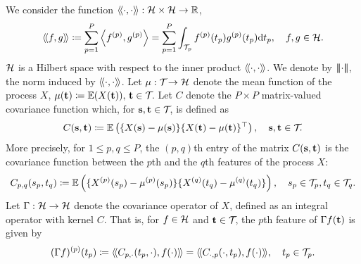 We consider the function $\langle\!\langle\cdot, \cdot\rangle\!\rangle : \mathcal{H} \times \mathcal{H} \rightarrow \mathbb{R}$,
\begin{equation}\label{eq:innerprodH}
    \langle\!\langle f, g\rangle\!\rangle \coloneqq \sum_{p=1}^{P} \left\langle f^{(p)}, g^{(p)}\right\rangle = \sum_{p=1}^{P}\int_{\mathcal{T}_{p}} f^{(p)}(t_p)g^{(p)}(t_p) {\rm d} t_p, \quad f, g \in \mathcal{H}.
\end{equation}
$\mathcal{H}$ is a Hilbert space with respect to the inner product $\langle\!\langle\cdot, \cdot\rangle\!\rangle$\citep{happMultivariateFunctionalPrincipal2018a}. We denote by $\left|\!\left|\!\left|\cdot\right|\!\right|\!\right|$, the norm induced by $\langle\!\langle\cdot, \cdot\rangle\!\rangle$. Let $\mu : \mathcal{T}_{} \rightarrow \mathcal{H}$ denote the mean function of the process $X$, $\mu(\mathbf{t}) \coloneqq \mathbb{E}(X(\mathbf{t})),\,\mathbf{t} \in \mathcal{T}_{}$. Let $C$ denote the $P \times P$ matrix-valued covariance function which, for $\mathbf{s}, \mathbf{t} \in \mathcal{T}_{}$, is defined as
\begin{equation}\label{eq:covariance_function}
    C(\mathbf{s}, \mathbf{t}) \coloneqq \mathbb{E}\left(\{X(\mathbf{s}) - \mu(\mathbf{s})\}\{X(\mathbf{t}) - \mu(\mathbf{t})\}^{\top}\right), \quad \mathbf{s}, \mathbf{t} \in \mathcal{T}_{}.
\end{equation}
More precisely, for $1 \leq p, q \leq P$, the $(p, q)$th entry of the matrix $C(\mathbf{s}, \mathbf{t})$ is the covariance function between the $p$th and the $q$th features of the process $X$:
\begin{equation}\label{eq:covariance_function_components}
    C_{p, q}(s_p, t_q) \coloneqq \mathbb{E}\left(\{X^{(p)}(s_p) - \mu^{(p)}(s_p)\}\{X^{(q)}(t_q) - \mu^{(q)}(t_q)\}\right), \quad s_p \in \mathcal{T}_{p}, t_q \in \mathcal{T}_{q}.
\end{equation}
Let $\Gamma : \mathcal{H} \rightarrow \mathcal{H}$ denote the covariance operator of $X$, defined as an integral operator with kernel $C$. That is, for $f \in \mathcal{H}$ and $\mathbf{t} \in \mathcal{T}_{}$, the $p$th feature of $\Gamma f(\mathbf{t})$ is given by
\begin{equation}\label{eq:covariance_operator_components}
    (\Gamma f)^{(p)}(t_p) \coloneqq \langle\!\langle C_{p, \cdot}(t_p, \cdot), f(\cdot)\rangle\!\rangle = \langle\!\langle C_{\cdot, p}(\cdot, t_p), f(\cdot)\rangle\!\rangle, \quad t_p \in \mathcal{T}_{p}.
\end{equation}

